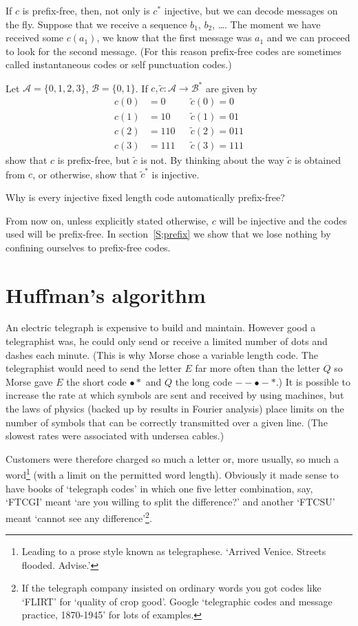 If $c$ is prefix-free, then, not only is $c^{*}$ injective, but we can decode
messages on the fly. Suppose that we receive a sequence 
$b_{1}$, $b_{2}$, \dots.
The moment we have received some $c(a_{1})$, we know that 
the first message was $a_{1}$
and we can proceed to look for the second message. (For this reason
prefix-free codes
are sometimes called instantaneous codes or self punctuation codes.)
\begin{exercise} Let  ${\mathcal A}=\{0,1,2,3\}$, ${\mathcal B}=\{0,1\}$.
If $c,\tilde{c}:{\mathcal A}\rightarrow{\mathcal B}^{*}$ are given by
\begin{align*}
c(0)&=0&&\tilde{c}(0)=0\\
c(1)&=10&&\tilde{c}(1)=01\\
c(2)&=110&&\tilde{c}(2)=011\\
c(3)&=111&&\tilde{c}(3)=111
\end{align*}
show that $c$ is prefix-free, but $\tilde{c}$ is not.
By thinking about the way $\tilde{c}$ is obtained from $c$, or otherwise,
show that $\tilde{c}^{*}$ is injective.
\end{exercise}
\begin{exercise}\label{E;auto free} 
Why is every injective fixed
length code automatically prefix-free?
\end{exercise}
From now on, unless explicitly stated otherwise, $c$ will be injective
and the codes used will be prefix-free. In section~\ref{S;prefix} 
we show
that we lose nothing by confining ourselves to prefix-free codes.
\section{Huffman's algorithm} An electric telegraph is expensive 
to build and maintain. However good a telegraphist was,
he could only send or receive a limited number of dots and dashes
each minute. (This is why  Morse chose a variable length code.
The telegraphist would need to send the letter $E$ far more often than
the letter $Q$ so Morse gave $E$ the short
code $\bullet*$ and $Q$ the long code $--\bullet-*$.)
It is possible to increase the rate at which symbols are
sent and received by using machines, but the laws of
physics (backed up by results in Fourier analysis)
place limits on the number of symbols that can be
correctly transmitted over a given line.
(The slowest rates were associated with undersea cables.)

Customers were therefore charged so much
a letter or, more usually, so 
much a word\footnote{Leading to a
prose style known as telegraphese.
`Arrived Venice. Streets flooded. Advise.'}
(with a limit
on the permitted word length).
Obviously it made sense to have books
of `telegraph codes' in which one five letter
combination, say, `FTCGI'
meant `are you willing to split the difference?'
and  another `FTCSU' meant
`cannot see any difference'\footnote{If the telegraph
company insisted on ordinary words you got
codes like `FLIRT' for `quality of crop good'.
Google `telegraphic codes and message practice, 1870-1945'
for lots of examples.}.
 
